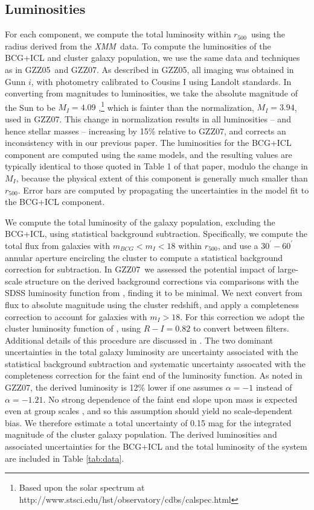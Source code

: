 \documentclass[preprint]{emulateapj}
\newcommand\rfive{$r_{500}$}
\newcommand\pone{GZZ05}
\newcommand\ptwo{GZZ07}
\newcommand{\xmm}{\textit{XMM}}
\begin{document}
\subsection{Luminosities}

For each component,
we compute the total luminosity within \rfive\, using the radius
derived from the \xmm\ data. 
To compute the luminosities of the BCG+ICL and cluster 
galaxy population, we use the same data and techniques as in \pone\ and \ptwo. As
described in \pone, all imaging was obtained in Gunn $i$, with photometry calibrated
to Cousins I using Landolt standards.
In converting from magnitudes to
luminosities, we take the absolute magnitude of the Sun to be
$M_I=4.09$ \citep[Vega;][]{mancone2012},{\footnote{Based upon the
    solar spectrum at
    http://www.stsci.edu/hst/observatory/cdbs/calspec.html}} which is
fainter than the normalization, $M_I=3.94$, used in \ptwo.  This
change in normalization results in all luminosities -- and hence
stellar masses -- increasing by 15\% relative to \ptwo, and 
corrects an inconsistency with \citet{cappellari2006} in our 
previous paper. 
   The
luminosities for the BCG+ICL component are computed using the same
models, 
and the resulting values are typically identical to those quoted in
Table 1 of that paper, modulo the change in $M_I$, because the
physical extent of this component is generally much smaller than
\rfive. Error bars are computed by propagating the uncertainties in
the model fit to the BCG+ICL component.

We compute the total luminosity of the galaxy population, excluding
the BCG+ICL, using statistical background subtraction. Specifically,
we compute the total flux from galaxies with $m_{BCG}<m_I<18$ within
\rfive, and use a $30^\prime - 60^\prime$ annular aperture encircling
the cluster to compute a statistical background correction for
subtraction. In \ptwo\ we assessed the potential impact of large-scale
structure on the derived background corrections via comparisons with
the SDSS luminosity function from \citet{blanton2003}, finding it to
be minimal.  We next convert from flux to absolute magnitude using the
cluster redshift, and apply a completeness correction to account for
galaxies with $m_I>18$. For this correction we adopt the cluster
luminosity function of \citet{christlein2003}, using $R-I=0.82$ to
convert between filters.  Additional details of this procedure are
discussed in \citet{gonzalez2007}.  The two dominant uncertainties in
the total galaxy luminosity are uncertainty associated with the
statistical background subtraction and systematic uncertainty
assocated with the completeness correction for the faint end of the
luminosity function. As noted in \ptwo, the derived luminosity is 12\%
lower if one assumes $\alpha=-1$ instead of $\alpha=-1.21$. No strong
dependence of the faint end slope upon mass is expected even at group
scales \citep[e.g.][]{zandivarez2011}, and so this assumption should
yield no scale-dependent bias. We therefore estimate a total
uncertainty of 0.15 mag for the integrated magnitude of the cluster
galaxy population.  The derived luminosities and associated
uncertainties for the BCG+ICL and the total luminosity of the system
are included in Table \ref{tab:data}.
\end{document}
